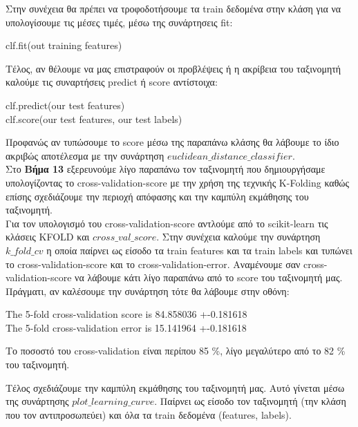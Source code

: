 \documentclass[11pt]{article} %
\begin{document}
Στην συνέχεια θα πρέπει να τροφοδοτήσουμε τα train δεδομένα στην κλάση για να υπολογίσουμε τις μέσες τιμές, μέσω της συνάρτησεις fit:
\begin{center}
clf.fit(out training features)
\end{center}

Τέλος, αν θέλουμε να μας επιστραφούν οι προβλέψεις ή η ακρίβεια του ταξινομητή καλούμε τις συναρτήσεις predict ή score αντίστοιχα:
\begin{center}
clf.predict(our test features)\\
clf.score(our test features, our test labels)
\end{center}

Προφανώς αν τυπώσουμε το score μέσω της παραπάνω κλάσης θα λάβουμε το ίδιο ακριβώς αποτέλεσμα με την συνάρτηση $euclidean\_distance\_classifier$.\\

Στο \textbf{Βήμα 13} εξερευνούμε λίγο παραπάνω τον ταξινομητή που δημιουργήσαμε υπολογίζοντας το cross-validation-score με την χρήση της τεχνικής K-Folding καθώς επίσης σχεδιάζουμε την περιοχή απόφασης και την καμπύλη εκμάθησης του ταξινομητή.\\

Για τον υπολογισμό του cross-validation-score αντλούμε από το scikit-learn τις κλάσεις ΚFOLD και $cross\_val\_score$. Στην συνέχεια καλούμε την συνάρτηση $k\_fold\_cv$ η οποία παίρνει ως είσοδο τα train features και τα train labels και τυπώνει το cross-validation-score και το cross-validation-error. Αναμένουμε σαν cross-validation-score να λάβουμε κάτι λίγο παραπάνω από το score του ταξινομητή μας. Πράγματι, αν καλέσουμε την συνάρτηση τότε θα λάβουμε στην οθόνη:
\begin{center}
The 5-fold cross-validation score is 84.858036 +-0.181618\\
The 5-fold cross-validation error is 15.141964 +-0.181618
\end{center}

Το ποσοστό του cross-validation είναι περίπου 85 \%, λίγο μεγαλύτερο από το 82 \% του ταξινομητή.



Τέλος σχεδιάζουμε την καμπύλη εκμάθησης του ταξινομητή μας. Αυτό γίνεται μέσω της συνάρτησης $plot\_learning\_curve$. Παίρνει ως είσοδο τον ταξινομητή (την κλάση που τον αντιπροσωπεύει) και όλα τα train δεδομένα (features, labels). 
\end{document}
